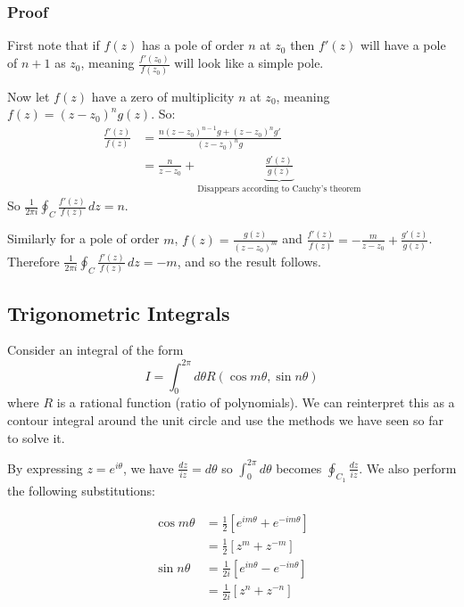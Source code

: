 \documentclass{physics_notes}
\begin{document}
\subsubsection*{Proof}

First note that if $f(z)$ has a pole of order $n$ at $z_0$ then $f'(z)$ will have a pole of $n+1$ as $z_0$, meaning $\frac{f'(z_0)}{f(z_0)}$ will look like a simple pole. 

Now let $f(z)$ have a zero of multiplicity $n$ at $z_0$, meaning $f(z) = (z-z_0)^n g(z)$. So:
\begin{align*} 
\frac{f'(z)}{f(z)} &= \frac{n(z-z_0)^{n-1} g + (z-z_0)^n g'}{(z-z_0)^n g} \\
&= \frac{n}{z-z_0} + \underbrace{\frac{g'(z)}{g(z)}}_\text{Disappears according to Cauchy's theorem}
\end{align*}
So $\frac{1}{2\pi i}\oint_C \frac{f'(z)}{f(z)}\, dz = n$.

Similarly for a pole of order $m$, $f(z) = \frac{g(z)}{(z-z_0)^m}$ and $\frac{f'(z)}{f(z)} = -\frac{m}{z-z_0} + \frac{g'(z)}{g(z)}$. Therefore $\frac{1}{2\pi i}\oint_C \frac{f'(z)}{f(z)}\, dz = -m$, and so the result follows. 

\subsection{Trigonometric Integrals }

Consider an integral of the form 
\[ I = \int_{0}^{2\pi} d\theta R(\cos{m\theta}, \sin{n\theta}) \]
where $R$ is a rational function (ratio of polynomials). We can reinterpret this as a contour integral around the unit circle and use the methods we have seen so far to solve it. 

By expressing $z = e^{i\theta}$, we have $\frac{dz}{iz} = d\theta$ so $\int_{0}^{2\pi}d\theta$ becomes $\oint_{C_1} \frac{dz}{iz}$. We also perform the following substitutions:

\begin{align*}
\cos{m\theta} &= \frac{1}{2}\left[e^{im\theta} + e^{-im\theta}\right] \\
&= \frac{1}{2}\left[z^m + z^{-m}\right] \\
\sin{n\theta} &= \frac{1}{2i}\left[e^{in\theta} - e^{-in\theta}\right] \\
&= \frac{1}{2i}\left[z^n + z^{-n}\right] 
\end{align*}
\end{document}
